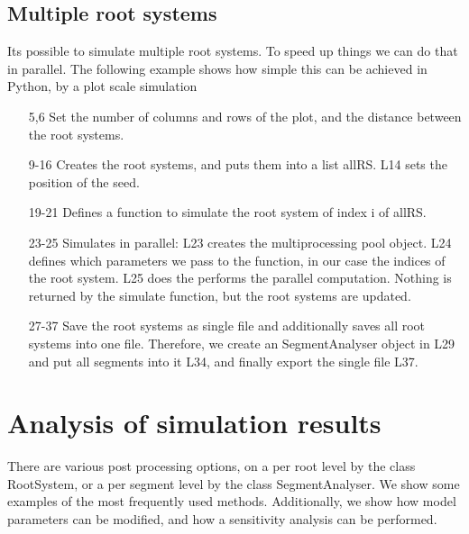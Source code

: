 \documentclass[a4paper]{article}
\begin{document}
\subsection{Multiple root systems}

Its possible to simulate multiple root systems. To speed up things we can do that in parallel.
The following example shows how simple this can be achieved in Python, by a plot scale simulation



\begin{itemize}

\item[5,6] Set the number of columns and rows of the plot, and the distance between the root systems.

\item[9-16] Creates the root systems, and puts them into a list allRS. L14 sets the position of the seed. 

\item[19-21] Defines a function to simulate the root system of index i of allRS. 

\item[23-25] Simulates in parallel: L23 creates the multiprocessing pool object. L24 defines which parameters we pass to the function, in our case the indices of the root system. 
L25 does the performs the parallel computation. Nothing is returned by the simulate function, but the root systems are updated.

\item[27-37] Save the root systems as single file and additionally saves all root systems into one file. 
Therefore, we create an SegmentAnalyser object in L29 and put all segments into it L34, and finally export the single file L37.

\end{itemize}



\section{Analysis of simulation results}

There are various post processing options, on a per root level by the class RootSystem, or a per segment level by the class SegmentAnalyser.
We show some examples of the most frequently used methods. Additionally, we show how model parameters can be modified, 
and how a sensitivity analysis can be performed. 
\end{document}

